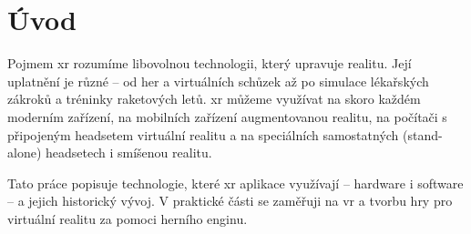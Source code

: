 \chapter*{Úvod}

Pojmem \gls{xr} rozumíme libovolnou technologii, který upravuje realitu. Její uplatnění je různé -- od her a virtuálních schůzek až po simulace lékařských zákroků a tréninky raketových letů. \gls{xr} můžeme využívat na skoro každém moderním zařízení, na mobilních zařízení augmentovanou realitu, na počítači s připojeným headsetem virtuální realitu a na speciálních samostatných (stand-alone) headsetech i smíšenou realitu. 

Tato práce popisuje technologie, které \gls{xr} aplikace využívají -- hardware i software -- a jejich historický vývoj. V praktické části se zaměřuji na \gls{vr} a tvorbu hry pro virtuální realitu za pomoci herního enginu.  